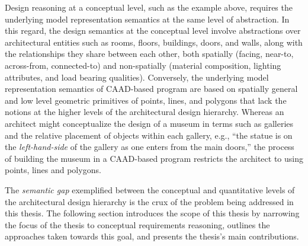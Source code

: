 \documentclass[12pt]{ucthesis}
\begin{document}
Design reasoning at a conceptual level, such as the example above, requires the underlying model representation semantics at the same level of abstraction. In this regard, the design semantics at the conceptual level involve abstractions over architectural entities such as rooms, floors, buildings, doors, and walls, along with the relationships they share between each other, both spatially (facing, near-to, across-from, connected-to) and non-spatially (material composition, lighting attributes, and load bearing qualities). Conversely, the underlying model representation semantics of CAAD-based program are based on spatially general and low level geometric primitives of points, lines, and polygons that lack the notions at the higher levels of the architectural design hierarchy. Whereas an architect might conceptualize the design of a museum in terms such as galleries and the relative placement of objects within each gallery, e.g., ``the statue is on the \emph{left-hand-side} of the gallery as one enters from the main doors,'' the process of building the museum in a CAAD-based program restricts the architect to using points, lines and polygons. 

The \emph{semantic gap} exemplified between the conceptual and quantitative levels of the architectural design hierarchy is the crux of the problem being addressed in this thesis. The following section introduces the scope of this thesis by narrowing the focus of the thesis to conceptual requirements reasoning, outlines the approaches taken towards this goal, and presents the thesis's main contributions. 



\end{document}
